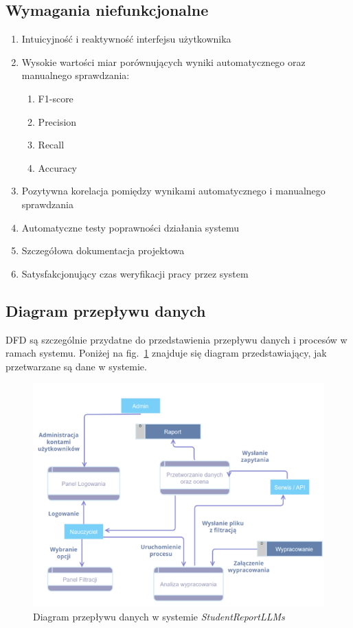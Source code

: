 \documentclass[a4paper, 12pt]{article}
\begin{document}
\subsection{Wymagania niefunkcjonalne}

\begin{enumerate}
    \item Intuicyjność i reaktywność interfejsu użytkownika
    \item Wysokie wartości miar porównujących wyniki automatycznego oraz manualnego sprawdzania:
    \begin{enumerate}
        \item F1-score
        \item Precision
        \item Recall
        \item Accuracy
    \end{enumerate}
    \item Pozytywna korelacja pomiędzy wynikami automatycznego i manualnego sprawdzania
    \item Automatyczne testy poprawności działania systemu
    \item Szczegółowa dokumentacja projektowa
    \item Satysfakcjonujący czas weryfikacji pracy przez system
\end{enumerate}

\subsection{Diagram przepływu danych}
DFD są szczególnie przydatne do przedstawienia przepływu danych i procesów w ramach systemu.
Poniżej na fig.~\ref{fig:dfd} znajduje się diagram przedstawiający, jak przetwarzane są dane w systemie.

\begin{figure}[H]
    \centering
    \includegraphics[width=\textwidth]{img/DFD}
    \caption{Diagram przepływu danych w systemie \textit{StudentReportLLMs}}
    \label{fig:dfd}
\end{figure}
\end{document}
